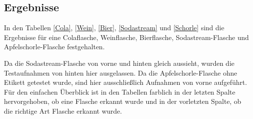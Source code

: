 \subsection{Ergebnisse}
In den Tabellen \ref{Cola}, \ref{Wein}, \ref{Bier}, \ref{Sodastream} und \ref{Schorle} sind die Ergebnisse für eine Colaflasche, Weinflasche, Bierflasche, Sodastream-Flasche und Apfelschorle-Flasche festgehalten.

\bigskip

Da die Sodastream-Flasche von vorne und hinten gleich aussieht, wurden die Testaufnahmen von hinten hier ausgelassen.
Da die Apfelschorle-Flasche ohne Etikett getestet wurde, sind hier ausschließlich Aufnahmen von vorne aufgeführt.
Für den einfachen Überblick ist in den Tabellen farblich in der letzten Spalte hervorgehoben, ob eine Flasche erkannt wurde und in der vorletzten Spalte, ob die richtige Art Flasche erkannt wurde.

